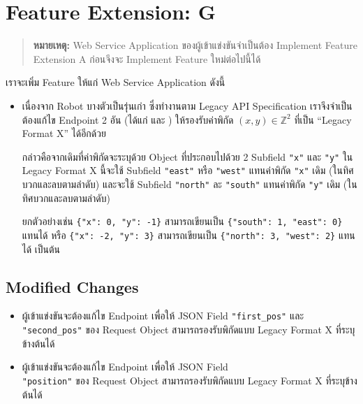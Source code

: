 
%  

\section{Feature Extension: G}

\begin{quote}
  \footnotesize
  \textbf{หมายเหตุ:} Web Service Application ของผู้เข้าแข่งขันจำเป็นต้อง Implement Feature Extension A ก่อนจึงจะ Implement Feature ใหม่ต่อไปนี้ได้
\end{quote}

\noindent
เราจะเพิ่ม Feature ให้แก่ Web Service Application ดังนี้
\begin{itemize}[topsep=0pc,itemsep=0pc,parsep=0.5pc]
\item 
    เนื่องจาก Robot บางตัวเป็นรุ่นเก่า ซึ่งทำงานตาม Legacy API Specification เราจึงจำเป็นต้องแก้ไข Endpoint 2 อัน (ได้แก่  และ )  ให้รองรับค่าพิกัด $(x,y) \in \mathbb{Z}^2$ ที่เป็น \hrsp“Legacy Format X”{\hrsp} ได้อีกด้วย

    กล่าวคือจากเดิมที่ค่าพิกัดจะระบุด้วย Object ที่ประกอบไปด้วย 2 Subfield \lstinline{"x"} และ \lstinline{"y"} \; 
    ใน Legacy Format X นี้จะใช้ Subfield \lstinline{"east"} หรือ \lstinline{"west"} แทนค่าพิกัด \lstinline{"x"} เดิม (ในทิศบวกและลบตามลำดับ) \; 
    และจะใช้ Subfield \lstinline{"north"} ละ \lstinline{"south"} แทนค่าพิกัด \lstinline{"y"} เดิม (ในทิศบวกและลบตามลำดับ)

    ยกตัวอย่างเช่น \lstinline'{"x": 0, "y": -1}' สามารถเขียนเป็น \lstinline'{"south": 1, "east": 0}' แทนได้ หรือ \lstinline'{"x": -2, "y": 3}' สามารถเขียนเป็น \lstinline'{"north": 3, "west": 2}' แทนได้ เป็นต้น
\end{itemize}

\subsection{Modified Changes}

\begin{itemize}[parsep=0.5pc]
\item 
    ผู้เข้าแข่งขันจะต้องแก้ไข Endpoint  เพื่อให้ JSON Field \lstinline{"first_pos"} และ \\\lstinline{"second_pos"} ของ Request Object สามารถรองรับพิกัดแบบ Legacy Format X ที่ระบุข้างต้นได้
\item 
    ผู้เข้าแข่งขันจะต้องแก้ไข Endpoint  เพื่อให้ JSON Field \\\lstinline{"position"} ของ Request Object สามารถรองรับพิกัดแบบ Legacy Format X ที่ระบุข้างต้นได้
\end{itemize}


